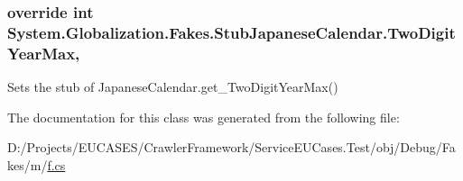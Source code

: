 \hypertarget{class_system_1_1_globalization_1_1_fakes_1_1_stub_japanese_calendar_a8973763408f91c6bac7c6f448a0cb576}{
\subsubsection[{Two\-Digit\-Year\-Max}]{\setlength{\rightskip}{0pt plus 5cm}override int System.\-Globalization.\-Fakes.\-Stub\-Japanese\-Calendar.\-Two\-Digit\-Year\-Max\hspace{0.3cm}{\ttfamily [get]}, {\ttfamily [set]}}}\label{class_system_1_1_globalization_1_1_fakes_1_1_stub_japanese_calendar_a8973763408f91c6bac7c6f448a0cb576}


Sets the stub of Japanese\-Calendar.\-get\-\_\-\-Two\-Digit\-Year\-Max()



The documentation for this class was generated from the following file\-:\begin{DoxyCompactItemize}
\item 
D\-:/\-Projects/\-E\-U\-C\-A\-S\-E\-S/\-Crawler\-Framework/\-Service\-E\-U\-Cases.\-Test/obj/\-Debug/\-Fakes/m/\hyperlink{m_2f_8cs}{f.\-cs}\end{DoxyCompactItemize}
